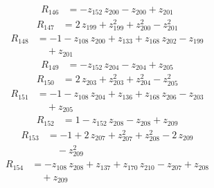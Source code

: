 \begin{equation*}\begin{aligned}
R_{146}&=-z_{152}\,z_{200} -z_{200} +z_{201}
\end{aligned}\end{equation*}
\begin{equation*}\begin{aligned}
R_{147}&=2\,z_{199} +z_{199}^{2} +z_{200}^{2} -z_{201}^{2}
\end{aligned}\end{equation*}
\begin{equation*}\begin{aligned}
R_{148}&=-1 -z_{108}\,z_{200} +z_{133} +z_{168}\,z_{202} -z_{199} \\
&\quad +z_{201}
\end{aligned}\end{equation*}
\begin{equation*}\begin{aligned}
R_{149}&=-z_{152}\,z_{204} -z_{204} +z_{205}
\end{aligned}\end{equation*}
\begin{equation*}\begin{aligned}
R_{150}&=2\,z_{203} +z_{203}^{2} +z_{204}^{2} -z_{205}^{2}
\end{aligned}\end{equation*}
\begin{equation*}\begin{aligned}
R_{151}&=-1 -z_{108}\,z_{204} +z_{136} +z_{168}\,z_{206} -z_{203} \\
&\quad +z_{205}
\end{aligned}\end{equation*}
\begin{equation*}\begin{aligned}
R_{152}&=1 -z_{152}\,z_{208} -z_{208} +z_{209}
\end{aligned}\end{equation*}
\begin{equation*}\begin{aligned}
R_{153}&=-1 +2\,z_{207} +z_{207}^{2} +z_{208}^{2} -2\,z_{209} \\
&\quad -z_{209}^{2}
\end{aligned}\end{equation*}
\begin{equation*}\begin{aligned}
R_{154}&=-z_{108}\,z_{208} +z_{137} +z_{170}\,z_{210} -z_{207} +z_{208} \\
&\quad +z_{209}
\end{aligned}\end{equation*}
